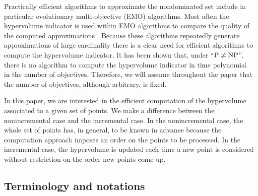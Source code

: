 \documentclass[a4paper,11pt]{article}
\begin{document}
Practically efficient algorithms to approximate the nondominated set include in particular
evolutionary multi-objective (EMO) algorithms.
Most often the hypervolume indicator is used within EMO algorithms 
to compare the quality 
of the computed approximations \citep{BeuNauEmm07, WagBeuNau07}.
Because these algorithms repeatedly generate
approximations of large cardinality there is a clear need for efficient algorithms 
to compute the hypervolume indicator.
It has been shown \citep{BriFri10} that, under ``${\rm P} \neq {\rm NP}$'', 
there is no algorithm to compute the hypervolume indicator in time polynomial 
in the number of objectives. 
Therefore, we will assume throughout the paper that the number of objectives, 
although arbitrary, is fixed.

In this paper, we are interested in the efficient computation 
of the hypervolume associated to a given set of points.
We make a difference between the nonincremental case
and the incremental case.
In the nonincremental case, 
the whole set of points has, in general, to be known in advance
because the computation approach imposes an order on the points to be processed.
In the incremental case, the hypervolume is updated each time a new point is considered
without restriction on the order new points come up.


\subsection{Terminology and notations}
\end{document}
